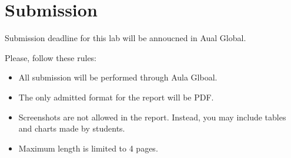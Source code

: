 \clearpage
\section{Submission}

Submission deadline for this lab will be annoucned in Aual Global.

Please, follow these rules:

\begin{itemize}

  \item All submission will be performed through Aula Glboal.

  \item The only admitted format for the report will be PDF.

  \item Screenshots are not allowed in the report.
        Instead, you may include tables and charts made by students.

  \item Maximum length is limited to 4 pages.

\end{itemize}
